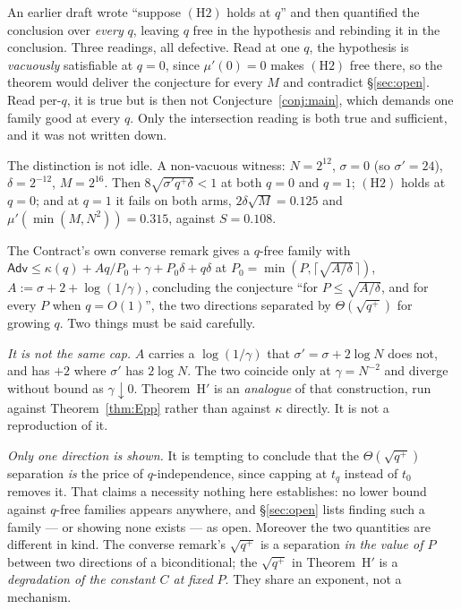 \documentclass{aicr-solution}
\newcommand{\Adv}{\mathsf{Adv}}
\begin{document}
\begin{remark}
\label{rem:H2every}
An earlier draft wrote ``suppose $(\mathrm{H2})$ holds at $q$'' and then quantified
the conclusion over \emph{every} $q$, leaving $q$ free in the hypothesis and
rebinding it in the conclusion. Three readings, all defective. Read at one $q$, the
hypothesis is \emph{vacuously} satisfiable at $q = 0$, since $\mu'(0) = 0$ makes
$(\mathrm{H2})$ free there, so the theorem would deliver the conjecture for every
$M$ and contradict \S\ref{sec:open}. Read per-$q$, it is true but is then not
Conjecture~\ref{conj:main}, which demands one family good at every $q$. Only the
intersection reading is both true and sufficient, and it was not written down.

The distinction is not idle. A non-vacuous witness: $N = 2^{12}$, $\sigma = 0$ (so
$\sigma' = 24$), $\delta = 2^{-12}$, $M = 2^{16}$. Then
$8\sqrt{\sigma' q^{+}\delta} < 1$ at both $q = 0$ and $q = 1$; $(\mathrm{H2})$
holds at $q = 0$; and at $q = 1$ it fails on both arms, $2\delta\sqrt{M} = 0.125$
and $\mu'(\min(M,N^{2})) = 0.315$, against $S = 0.108$.
\end{remark}

\begin{remark}
\label{rem:reduces}
The Contract's own converse remark gives a $q$-free family with
$\Adv \le \kappa(q) + Aq/P_0 + \gamma + P_0\delta + q\delta$ at
$P_0 = \min(P,\lceil\sqrt{A/\delta}\,\rceil)$, $A := \sigma + 2 + \log(1/\gamma)$,
concluding the conjecture ``for $P \le \sqrt{A/\delta}$, and for every $P$ when
$q = O(1)$'', the two directions separated by $\Theta(\sqrt{q^{+}})$ for growing
$q$. Two things must be said carefully.

\emph{It is not the same cap.} $A$ carries a $\log(1/\gamma)$ that
$\sigma' = \sigma + 2\log N$ does not, and has $+2$ where $\sigma'$ has
$2\log N$. The two coincide only at $\gamma = N^{-2}$ and diverge without bound as
$\gamma \downarrow 0$. Theorem~H$'$ is an \emph{analogue} of that construction, run
against Theorem~\ref{thm:Epp} rather than against $\kappa$ directly. It is not a
reproduction of it.

\emph{Only one direction is shown.} It is tempting to conclude that the
$\Theta(\sqrt{q^{+}})$ separation \emph{is} the price of $q$-independence, since
capping at $t_q$ instead of $t_0$ removes it. That claims a necessity nothing here
establishes: no lower bound against $q$-free families appears anywhere, and
\S\ref{sec:open} lists finding such a family --- or showing none exists --- as
open. Moreover the two quantities are different in kind. The converse remark's
$\sqrt{q^{+}}$ is a separation \emph{in the value of $P$} between two directions of
a biconditional; the $\sqrt{q^{+}}$ in Theorem~H$'$ is a \emph{degradation of the
constant $C$ at fixed $P$}. They share an exponent, not a mechanism.
\end{remark}
\end{document}

